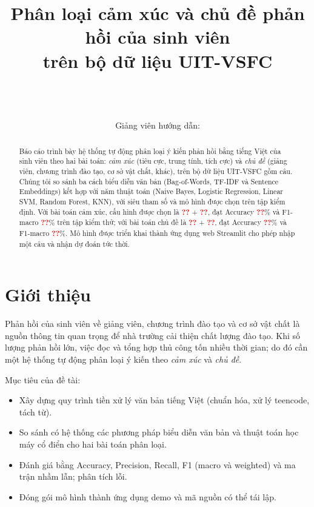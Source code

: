 \documentclass[12pt,a4paper]{article}
\title{\textbf{Phân loại cảm xúc và chủ đề phản hồi của sinh viên\\trên bộ dữ liệu UIT-VSFC}}
\author{\todo{Họ và tên} \\ \todo{MSSV} \\ \todo{Lớp / Khoa / Trường} \\[4pt] Giảng viên hướng dẫn: \todo{Tên giảng viên}}
\date{}
\newcommand{\unk}{\textcolor{red}{\textbf{??}}}
\providecommand{\BestSentFeature}{\unk}\providecommand{\BestSentModel}{\unk}\providecommand{\BestSentAcc}{\unk}
\providecommand{\BestSentFOne}{\unk}\providecommand{\BestSentFW}{\unk}
\providecommand{\BestTopicFeature}{\unk}\providecommand{\BestTopicModel}{\unk}\providecommand{\BestTopicAcc}{\unk}
\providecommand{\BestTopicFOne}{\unk}\providecommand{\BestTopicFW}{\unk}
\begin{document}
\maketitle

\begin{abstract}
Báo cáo trình bày hệ thống tự động phân loại ý kiến phản hồi bằng tiếng Việt của sinh viên theo hai bài toán:
\emph{cảm xúc} (tiêu cực, trung tính, tích cực) và \emph{chủ đề} (giảng viên, chương trình đào tạo, cơ sở vật chất, khác),
trên bộ dữ liệu UIT-VSFC gồm \NTotal{} câu. Chúng tôi so sánh ba cách biểu diễn văn bản (Bag-of-Words, TF-IDF và Sentence Embeddings)
kết hợp với năm thuật toán (Naive Bayes, Logistic Regression, Linear SVM, Random Forest, KNN), với siêu tham số và mô hình được chọn trên tập kiểm định.
Với bài toán cảm xúc, cấu hình được chọn là \BestSentFeature{} + \BestSentModel{}, đạt Accuracy \BestSentAcc\% và F1-macro \BestSentFOne\% trên tập kiểm thử;
với bài toán chủ đề là \BestTopicFeature{} + \BestTopicModel{}, đạt Accuracy \BestTopicAcc\% và F1-macro \BestTopicFOne\%.
Mô hình được triển khai thành ứng dụng web Streamlit cho phép nhập một câu và nhận dự đoán tức thời.
\end{abstract}

\tableofcontents
\newpage

\section{Giới thiệu}
Phản hồi của sinh viên về giảng viên, chương trình đào tạo và cơ sở vật chất là nguồn thông tin quan trọng để nhà trường cải thiện chất lượng đào tạo.
Khi số lượng phản hồi lớn, việc đọc và tổng hợp thủ công tốn nhiều thời gian; do đó cần một hệ thống tự động phân loại ý kiến theo
\emph{cảm xúc} và \emph{chủ đề}.

Mục tiêu của đề tài:
\begin{itemize}
  \item Xây dựng quy trình tiền xử lý văn bản tiếng Việt (chuẩn hóa, xử lý teencode, tách từ).
  \item So sánh có hệ thống các phương pháp biểu diễn văn bản và thuật toán học máy cổ điển cho hai bài toán phân loại.
  \item Đánh giá bằng Accuracy, Precision, Recall, F1 (macro và weighted) và ma trận nhầm lẫn; phân tích lỗi.
  \item Đóng gói mô hình thành ứng dụng demo và mã nguồn có thể tái lập.
\end{itemize}
\end{document}
